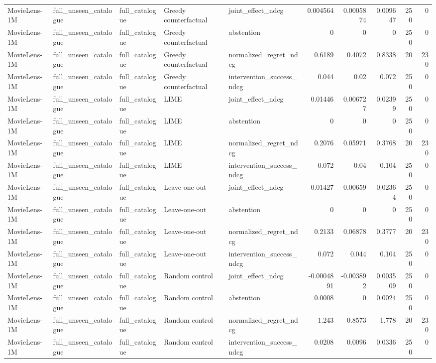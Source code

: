 \begin{table}[t]
{\begin{tabular}{lllllrrrrr}
MovieLens-1M & full\_unseen\_catalogue & full\_catalogue & Greedy counterfactual & joint\_effect\_ndcg & 0.004564 & 0.0005874 & 0.009647 & 250 & 0 \\
MovieLens-1M & full\_unseen\_catalogue & full\_catalogue & Greedy counterfactual & abstention & 0 & 0 & 0 & 250 & 0 \\
MovieLens-1M & full\_unseen\_catalogue & full\_catalogue & Greedy counterfactual & normalized\_regret\_ndcg & 0.6189 & 0.4072 & 0.8338 & 20 & 230 \\
MovieLens-1M & full\_unseen\_catalogue & full\_catalogue & Greedy counterfactual & intervention\_success\_ndcg & 0.044 & 0.02 & 0.072 & 250 & 0 \\
MovieLens-1M & full\_unseen\_catalogue & full\_catalogue & LIME & joint\_effect\_ndcg & 0.01446 & 0.006727 & 0.02399 & 250 & 0 \\
MovieLens-1M & full\_unseen\_catalogue & full\_catalogue & LIME & abstention & 0 & 0 & 0 & 250 & 0 \\
MovieLens-1M & full\_unseen\_catalogue & full\_catalogue & LIME & normalized\_regret\_ndcg & 0.2076 & 0.05971 & 0.3768 & 20 & 230 \\
MovieLens-1M & full\_unseen\_catalogue & full\_catalogue & LIME & intervention\_success\_ndcg & 0.072 & 0.04 & 0.104 & 250 & 0 \\
MovieLens-1M & full\_unseen\_catalogue & full\_catalogue & Leave-one-out & joint\_effect\_ndcg & 0.01427 & 0.00659 & 0.02364 & 250 & 0 \\
MovieLens-1M & full\_unseen\_catalogue & full\_catalogue & Leave-one-out & abstention & 0 & 0 & 0 & 250 & 0 \\
MovieLens-1M & full\_unseen\_catalogue & full\_catalogue & Leave-one-out & normalized\_regret\_ndcg & 0.2133 & 0.06878 & 0.3777 & 20 & 230 \\
MovieLens-1M & full\_unseen\_catalogue & full\_catalogue & Leave-one-out & intervention\_success\_ndcg & 0.072 & 0.044 & 0.104 & 250 & 0 \\
MovieLens-1M & full\_unseen\_catalogue & full\_catalogue & Random control & joint\_effect\_ndcg & -0.0004891 & -0.003892 & 0.003509 & 250 & 0 \\
MovieLens-1M & full\_unseen\_catalogue & full\_catalogue & Random control & abstention & 0.0008 & 0 & 0.0024 & 250 & 0 \\
MovieLens-1M & full\_unseen\_catalogue & full\_catalogue & Random control & normalized\_regret\_ndcg & 1.243 & 0.8573 & 1.778 & 20 & 230 \\
MovieLens-1M & full\_unseen\_catalogue & full\_catalogue & Random control & intervention\_success\_ndcg & 0.0208 & 0.0096 & 0.0336 & 250 & 0 \\

\end{tabular}}
\end{table}
